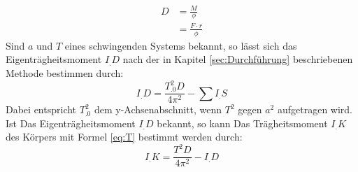 \begin{align}
D 	&= \frac{M}{\phi}\nonumber\\ 
	&= \frac{F\cdot r}{\phi} \label{eq:D}
\end{align}
Sind $a$ und $T$ eines schwingenden Systems bekannt, so lässt sich das Eigenträgheitsmoment $I_.D$ nach der in Kapitel \ref{sec:Durchführung} beschriebenen Methode bestimmen durch:
\begin{equation}
I_.D = \frac{T_.0^2D}{4\pi^2}-\sum I_.S \label{eq:I_D}
\end{equation}
Dabei entspricht $T_.0^2$ dem y-Achsenabschnitt, wenn $T^2$ gegen $a^2$ aufgetragen wird.
Ist Das Eigenträgheitsmoment $I_.D$ bekannt, so kann Das Trägheitsmoment $I_.K$ des Körpers mit Formel \eqref{eq:T} bestimmt werden durch:
\begin{equation}
I_.K = \frac{T^2D}{4\pi^2}-I_.D  \label{eq:I_K}
\end{equation}